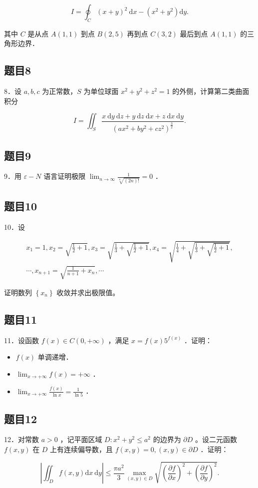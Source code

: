 \documentclass{article}
\begin{document}
\[
I=\oint_{C}(x+y)^{2} \mathrm{~d} x-\left(x^{2}+y^{2}\right) \mathrm{d} y .
\]

其中 \(C\) 是从点 \(A(1,1)\) 到点 \(B(2,5)\) 再到点 \(C(3,2)\) 最后到点 \(A(1,1)\) 的三角形边界．

\subsection{题目8}
8．设 \(a, b, c\) 为正常数，\(S\) 为单位球面 \(x^{2}+y^{2}+z^{2}=1\) 的外侧，计算第二类曲面积分

\[
I=\iint_{S} \frac{x \mathrm{~d} y \mathrm{~d} z+y \mathrm{~d} z \mathrm{~d} x+z \mathrm{~d} x \mathrm{~d} y}{\left(a x^{2}+b y^{2}+c z^{2}\right)^{\frac{3}{2}}} .
\]

\subsection{题目9}
9．用 \(\varepsilon-N\) 语言证明极限 \(\lim _{n \rightarrow \infty} \frac{1}{\sqrt[n]{(2 n)!}}=0\) ．

\subsection{题目10}
10．设

\[
\begin{gathered}
x_{1}=1, x_{2}=\sqrt{\frac{1}{2}+1}, x_{3}=\sqrt{\frac{1}{3}+\sqrt{\frac{1}{2}+1}}, x_{4}=\sqrt{\frac{1}{4}+\sqrt{\frac{1}{3}+\sqrt{\frac{1}{2}+1}}}, \\
\cdots, x_{n+1}=\sqrt{\frac{1}{n+1}+x_{n}}, \cdots
\end{gathered}
\]

证明数列 \(\left\{x_{n}\right\}\) 收敛并求出极限值。

\subsection{题目11}
11．设函数 \(f(x) \in C(0,+\infty)\) ，满足 \(x=f(x) 5^{f(x)}\) ．证明：

\begin{itemize}
  \item[（1）] \(f(x)\) 单调递增．
  \item[（2）] \(\lim _{x \rightarrow+\infty} f(x)=+\infty\) ．
  \item[（3）] \(\lim _{x \rightarrow+\infty} \frac{f(x)}{\ln x}=\frac{1}{\ln 5}\) ．
\end{itemize}

\subsection{题目12}
12．对常数 \(a>0\) ，记平面区域 \(D: x^{2}+y^{2} \leq a^{2}\) 的边界为 \(\partial D\) 。设二元函数 \(f(x, y)\) 在 \(D\) 上有连续偏导数，且 \(f(x, y)=0,(x, y) \in \partial D\) ．证明：

\[
\left|\iint_{D} f(x, y) \mathrm{d} x \mathrm{~d} y\right| \leq \frac{\pi a^{2}}{3} \max _{(x, y) \in D} \sqrt{\left(\frac{\partial f}{\partial x}\right)^{2}+\left(\frac{\partial f}{\partial y}\right)^{2}} .
\]
\end{document}
